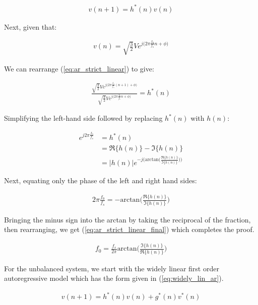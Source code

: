 \begin{align}
v(n+1)=h^*(n)v(n) \label{eq:ar_strict_linear}
\end{align}

\noindent{}Next, given that:

\begin{align*}
v(n) = \sqrt{\frac{3}{2}}Ve^{j\big(2\pi\frac{f_0}{f_s}n+\phi\big)}
\end{align*}

\noindent{}We can rearrange (\ref{eq:ar_strict_linear}) to give:

\begin{align*}
\frac{\sqrt{\frac{3}{2}}Ve^{j\big(2\pi\frac{f_0}{f_s}(n+1)+\phi\big)}}{\sqrt{\frac{3}{2}}Ve^{j\big(2\pi\frac{f_0}{f_s}n+\phi\big)}} = h^*(n)
\end{align*}

\noindent{}Simplifying the left-hand side followed by replacing $h^*(n)$ with $h(n)$:

\begin{align*}
e^{j2\pi\frac{f_0}{f_s}} &= h^*(n)\\
&=\Re\{h(n)\} - \Im\{h(n)\} \\
&=|h(n)|e^{-j\big(\text{arctan}\big(\frac{\Re\{h(n)\}}{\Im\{h(n)\}}\big)\big)}
\end{align*}

\noindent{}Next, equating only the phase of the left and right hand sides:

\begin{align*}
2\pi\frac{f_0}{f_s} = -\text{arctan}\bigg(\frac{\Re\{h(n)\}}{\Im\{h(n)\}}\bigg)
\end{align*}

\noindent{}Bringing the minus sign into the arctan by taking the reciprocal of the fraction, then rearranging, we get (\ref{eq:ar_strict_linear_final}) which completes the proof.

\begin{align}
f_0 = \frac{f_s}{2\pi}\text{arctan}\bigg(\frac{\Im\{h(n)\}}{\Re\{h(n)\}}\bigg) \label{eq:ar_strict_linear_final}
\end{align}

\noindent{}For the unbalanced system, we start with the widely linear first order autoregressive model which has the form given in (\ref{eq:widely_lin_ar}).

\begin{align}
v(n+1) = h^*(n)v(n) + g^*(n) v^*(n) \label{eq:widely_lin_ar}
\end{align}

